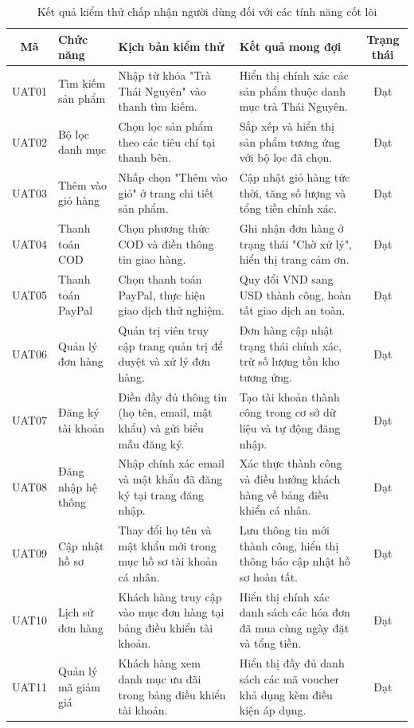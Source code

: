 \begin{table}[H]
    \centering
    \caption{Kết quả kiểm thử chấp nhận người dùng đối với các tính năng cốt lõi}
    \label{tab:kiem_thu}
    \small
    \begin{tabular}{c p{2.8cm} p{4.5cm} p{4.5cm} c}
        \toprule
        \textbf{Mã} & \textbf{Chức năng} & \textbf{Kịch bản kiểm thử} & \textbf{Kết quả mong đợi} & \textbf{Trạng thái} \\
        \midrule
        UAT01 & Tìm kiếm sản phẩm & Nhập từ khóa "Trà Thái Nguyên" vào thanh tìm kiếm. & Hiển thị chính xác các sản phẩm thuộc danh mục trà Thái Nguyên. & Đạt \\
        UAT02 & Bộ lọc danh mục & Chọn lọc sản phẩm theo các tiêu chí tại thanh bên. & Sắp xếp và hiển thị sản phẩm tương ứng với bộ lọc đã chọn. & Đạt \\
        UAT03 & Thêm vào giỏ hàng & Nhấp chọn "Thêm vào giỏ" ở trang chi tiết sản phẩm. & Cập nhật giỏ hàng tức thời, tăng số lượng và tổng tiền chính xác. & Đạt \\
        UAT04 & Thanh toán COD & Chọn phương thức COD và điền thông tin giao hàng. & Ghi nhận đơn hàng ở trạng thái "Chờ xử lý", hiển thị trang cảm ơn. & Đạt \\
        UAT05 & Thanh toán PayPal & Chọn thanh toán PayPal, thực hiện giao dịch thử nghiệm. & Quy đổi VND sang USD thành công, hoàn tất giao dịch an toàn. & Đạt \\
        UAT06 & Quản lý đơn hàng & Quản trị viên truy cập trang quản trị để duyệt và xử lý đơn hàng. & Đơn hàng cập nhật trạng thái chính xác, trừ số lượng tồn kho tương ứng. & Đạt \\
        UAT07 & Đăng ký tài khoản & Điền đầy đủ thông tin (họ tên, email, mật khẩu) và gửi biểu mẫu đăng ký. & Tạo tài khoản thành công trong cơ sở dữ liệu và tự động đăng nhập. & Đạt \\
        UAT08 & Đăng nhập hệ thống & Nhập chính xác email và mật khẩu đã đăng ký tại trang đăng nhập. & Xác thực thành công và điều hướng khách hàng về bảng điều khiển cá nhân. & Đạt \\
        UAT09 & Cập nhật hồ sơ & Thay đổi họ tên và mật khẩu mới trong mục hồ sơ tài khoản cá nhân. & Lưu thông tin mới thành công, hiển thị thông báo cập nhật hồ sơ hoàn tất. & Đạt \\
        UAT10 & Lịch sử đơn hàng & Khách hàng truy cập vào mục đơn hàng tại bảng điều khiển tài khoản. & Hiển thị chính xác danh sách các hóa đơn đã mua cùng ngày đặt và tổng tiền. & Đạt \\
        UAT11 & Quản lý mã giảm giá & Khách hàng xem danh mục ưu đãi trong bảng điều khiển tài khoản. & Hiển thị đầy đủ danh sách các mã voucher khả dụng kèm điều kiện áp dụng. & Đạt \\
        \bottomrule
    \end{tabular}
\end{table}

